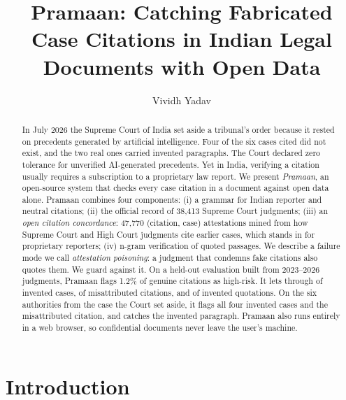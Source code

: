 \documentclass[sigconf,nonacm]{acmart}
\newcommand{\nJudgments}{38{,}413}
\newcommand{\nAttest}{47{,}770}
\newcommand{\genHigh}{1.2\%}
\begin{document}
\title{Pramaan: Catching Fabricated Case Citations in Indian Legal Documents with Open Data}

\author{Vividh Yadav}

\begin{abstract}
In July 2026 the Supreme Court of India set aside a tribunal's order because it rested on precedents
generated by artificial intelligence. Four of the six cases cited did not exist, and the two real ones
carried invented paragraphs. The Court declared zero tolerance for unverified AI-generated
precedents. Yet in India, verifying a citation usually requires a subscription to a proprietary law
report. We present \emph{Pramaan}, an open-source system that checks every case citation in a document
against open data alone. Pramaan combines four components:
(i) a grammar for Indian reporter and neutral citations;
(ii) the official record of \nJudgments{} Supreme Court judgments;
(iii) an \emph{open citation concordance}: \nAttest{} (citation, case) attestations mined from how
Supreme Court and High Court judgments cite earlier cases, which stands in for proprietary reporters;
(iv) n-gram verification of quoted passages.
We describe a failure mode we call \emph{attestation poisoning}: a judgment that condemns fake
citations also quotes them. We guard against it. On a held-out evaluation built from 2023--2026
judgments, Pramaan flags \genHigh{} of genuine citations as high-risk. It lets through
\fakeCaseMiss{} of invented cases, \wrongCiteMiss{} of misattributed citations, and \fakeQuoteMiss{}
of invented quotations. On the six authorities from the case the Court set aside, it flags all four
invented cases and the misattributed citation, and catches the invented paragraph. Pramaan also runs
entirely in a web browser, so confidential documents never leave the user's machine.
\end{abstract}


\maketitle

\section{Introduction}
\end{document}
